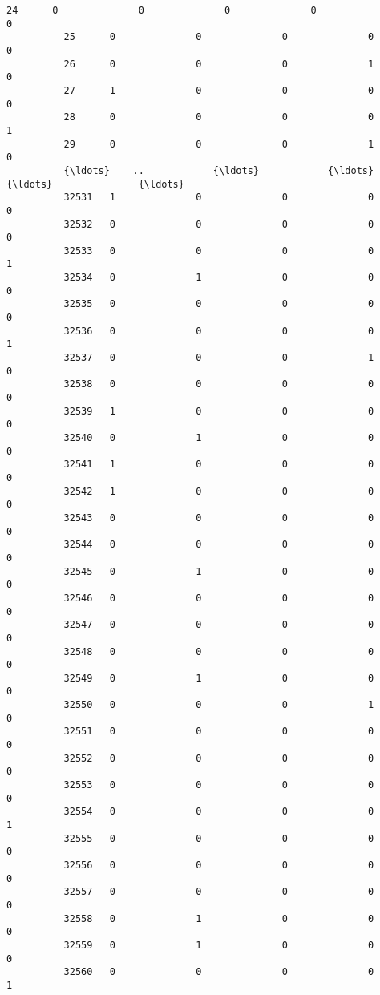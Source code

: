 \documentclass[11pt]{article}
\begin{document}
\begin{Verbatim}[commandchars=\\\{\}]
          24      0              0              0              0                 0   
          25      0              0              0              0                 0   
          26      0              0              0              1                 0   
          27      1              0              0              0                 0   
          28      0              0              0              0                 1   
          29      0              0              0              1                 0   
          {\ldots}    ..            {\ldots}            {\ldots}            {\ldots}               {\ldots}   
          32531   1              0              0              0                 0   
          32532   0              0              0              0                 0   
          32533   0              0              0              0                 1   
          32534   0              1              0              0                 0   
          32535   0              0              0              0                 0   
          32536   0              0              0              0                 1   
          32537   0              0              0              1                 0   
          32538   0              0              0              0                 0   
          32539   1              0              0              0                 0   
          32540   0              1              0              0                 0   
          32541   1              0              0              0                 0   
          32542   1              0              0              0                 0   
          32543   0              0              0              0                 0   
          32544   0              0              0              0                 0   
          32545   0              1              0              0                 0   
          32546   0              0              0              0                 0   
          32547   0              0              0              0                 0   
          32548   0              0              0              0                 0   
          32549   0              1              0              0                 0   
          32550   0              0              0              1                 0   
          32551   0              0              0              0                 0   
          32552   0              0              0              0                 0   
          32553   0              0              0              0                 0   
          32554   0              0              0              0                 1   
          32555   0              0              0              0                 0   
          32556   0              0              0              0                 0   
          32557   0              0              0              0                 0   
          32558   0              1              0              0                 0   
          32559   0              1              0              0                 0   
          32560   0              0              0              0                 1   
          

\end{Verbatim}
\end{document}
